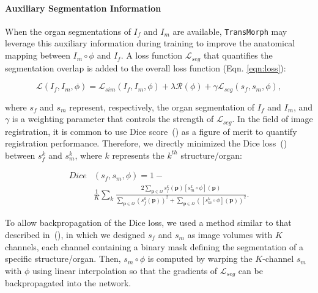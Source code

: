\documentclass[times,twocolumn,final]{elsarticle}
\begin{document}
\paragraph{Auxiliary Segmentation Information}
\label{sec:aux_seg}
When the organ segmentations of $I_f$ and $I_m$ are available, \texttt{TransMorph} may leverage this auxiliary information during training to improve the anatomical mapping between $I_m\circ\phi$ and $I_f$. A loss function $\mathcal{L}_{seg}$ that quantifies the segmentation overlap is added to the overall loss function (Eqn. \ref{eqn:loss}): 
\begin{linenomath}
\begin{equation}
\label{eqn:loss_w_seg}
    \mathcal{L}(I_f, I_m, \phi)=\mathcal{L}_{sim}(I_f, I_m, \phi)+\lambda\mathcal{R}(\phi) +\gamma\mathcal{L}_{seg}(s_f, s_m, \phi),
\end{equation}
\end{linenomath}
where $s_f$ and $s_m$ represent, respectively, the organ segmentation of $I_f$ and $I_m$, and $\gamma$ is a weighting parameter that controls the strength of $\mathcal{L}_{seg}$. In the field of image registration, it is common to use Dice score~(\cite{dice1945measures}) as a figure of merit to quantify registration performance. Therefore, we directly minimized the Dice loss~(\cite{milletari2016v}) between $s^k_f$ and $s^k_m$, where $k$ represents the $k^{th}$ structure/organ:
\begin{linenomath}
\begin{equation}
\label{eqn:dice}
\begin{split}
    Dice&(s_f, s_m, \phi)=1-\\
    &\frac{1}{K}\sum_k\frac{2\sum_{\mathbf{p}\in\Omega}s^k_f(\mathbf{p})[s^k_m\circ\phi](\mathbf{p})}{\sum_{\mathbf{p}\in\Omega}\left(s_f^k(\mathbf{p})\right)^2+\sum_{\mathbf{p}\in\Omega}\left([s^k_m\circ\phi](\mathbf{p})\right)^2}.
\end{split}
\end{equation}
\end{linenomath}
To allow backpropagation of the Dice loss, we used a method similar to that described in~(\cite{balakrishnan2019voxelmorph}), in which we designed $s_f$ and $s_m$ as image volumes with $K$ channels, each channel containing a binary mask defining the segmentation of a specific structure/organ. Then, $s_m\circ\phi$ is computed by warping the $K$-channel $s_m$ with $\phi$ using linear interpolation so that the gradients of $\mathcal{L}_{seg}$ can be backpropagated into the network. 
\end{document}
